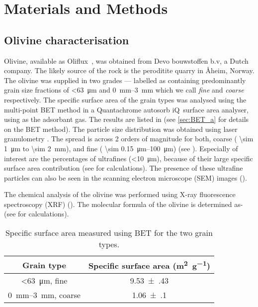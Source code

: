 \chapter{Materials and Methods}
\section{Olivine characterisation}\label{sec:olivine_character}
Olivine, available as Oliflux\texttrademark\ , was obtained from Devo bouwstoffen b.v, a Dutch company. The likely source of the rock is the peroditite quarry in \AA heim, Norway. The olivine was supplied in two grades --- labelled as containing predominantly grain size fractions of \SI{<63}{\micro\metre} and \SIrange[range-units = single,range-phrase = --]{0}{3}{\milli\metre} which we call \textit{fine} and \textit{coarse} respectively. The specific surface area of the grain types was analysed using the multi-point BET method in a Quantachrome autosorb iQ\texttrademark\ surface area analyser, using  as the adsorbant gas. The results are listed in  (see \cref{sec:BET_a} for details on the BET method). The particle size distribution was obtained using laser granulometry . The spread is across 2 orders of magnitude for both, coarse ( \SI{\sim 1}{\micro\meter} to \SI{\sim 2}{\milli\meter}), and fine ( \SIrange[range-units = single,range-phrase = --]{\sim 0.15}{100}{\micro\metre}) (see ). Especially of interest are the percentages of ultrafines (\SI{<10}{\micro\meter}), because of their large specific surface area contribution (see  for calculations). The presence of these ultrafine particles can also be seen in the scanning electron microscope (SEM) images (). 

The chemical analysis of the olivine was performed using X-ray fluorescence spectroscopy (XRF) (). The molecular formula of the olivine is determined as-\\  (see  for calculations).

\begin{table}[h!]
 \begin{tabular}{cc}
 \toprule
 \textbf{Grain type} & \textbf{Specific surface area (\si{\square\metre\per\gram})} \\
  \midrule
   \SI{<63}{\micro\metre}, fine & \num[separate-uncertainty]{9.53(43)}  \\
    \SIrange[,range-units = single,range-phrase = --]{0}{3}{\milli\metre}, coarse & \num[separate-uncertainty]{1.06(10)}\\
    \bottomrule
\end{tabular}
	\caption{Specific surface area measured using BET for the two grain types.}
  \label{tab:BET}
\end{table}

